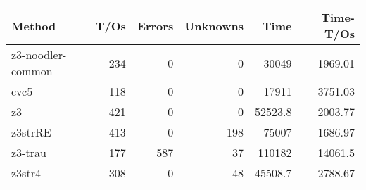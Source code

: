 \begin{tabular}{lrrrrr}
\hline
 Method            &   T/Os &   Errors &   Unknowns &     Time &   Time-T/Os \\
\hline
 z3-noodler-common &    234 &        0 &          0 &  30049   &     1969.01 \\
 cvc5              &    118 &        0 &          0 &  17911   &     3751.03 \\
 z3                &    421 &        0 &          0 &  52523.8 &     2003.77 \\
 z3strRE           &    413 &        0 &        198 &  75007   &     1686.97 \\
 z3-trau           &    177 &      587 &         37 & 110182   &    14061.5  \\
 z3str4            &    308 &        0 &         48 &  45508.7 &     2788.67 \\
\hline
\end{tabular}
